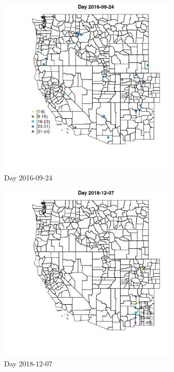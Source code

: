 \begin{figure} 
\centering  
\includegraphics[width=0.77\textwidth]{Code_Outputs/Report_ML_input_PM25_Step4_part_e_de_duplicated_aves_MapObsDay2016-09-24.jpg} 
\caption{\label{fig:Report_ML_input_PM25_Step4_part_e_de_duplicated_avesMapObsDay2016-09-24}Day 2016-09-24} 
\end{figure} 
 

\begin{figure} 
\centering  
\includegraphics[width=0.77\textwidth]{Code_Outputs/Report_ML_input_PM25_Step4_part_e_de_duplicated_aves_MapObsDay2018-12-07.jpg} 
\caption{\label{fig:Report_ML_input_PM25_Step4_part_e_de_duplicated_avesMapObsDay2018-12-07}Day 2018-12-07} 
\end{figure} 
 


